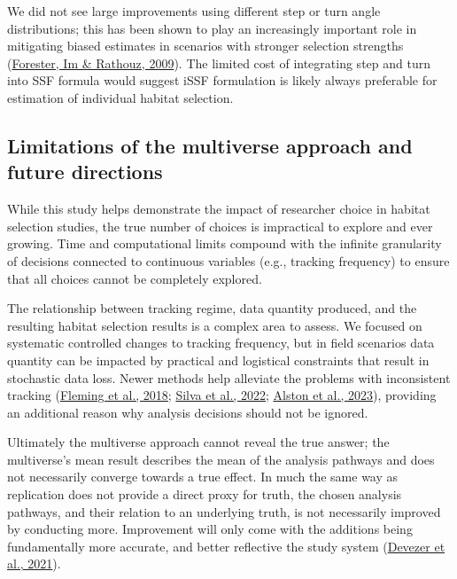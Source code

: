 \documentclass[10pt,a4paper]{article}
\begin{document}
We did not see large improvements using different step or turn angle distributions; this has been shown to play an increasingly important role in mitigating biased estimates in scenarios with stronger selection strengths (\protect\hyperlink{ref-forester_accounting_2009}{Forester, Im \& Rathouz, 2009}).
The limited cost of integrating step and turn into SSF formula would suggest iSSF formulation is likely always preferable for estimation of individual habitat selection.

\hypertarget{limitations-of-the-multiverse-approach-and-future-directions}{%
\subsection{Limitations of the multiverse approach and future directions}\label{limitations-of-the-multiverse-approach-and-future-directions}}

While this study helps demonstrate the impact of researcher choice in habitat selection studies, the true number of choices is impractical to explore and ever growing.
Time and computational limits compound with the infinite granularity of decisions connected to continuous variables (e.g., tracking frequency) to ensure that all choices cannot be completely explored.

The relationship between tracking regime, data quantity produced, and the resulting habitat selection results is a complex area to assess.
We focused on systematic controlled changes to tracking frequency, but in field scenarios data quantity can be impacted by practical and logistical constraints that result in stochastic data loss.
Newer methods help alleviate the problems with inconsistent tracking (\protect\hyperlink{ref-fleming_correcting_2018}{Fleming et al., 2018}; \protect\hyperlink{ref-silva_autocorrelationinformed_2022}{Silva et al., 2022}; \protect\hyperlink{ref-alston_mitigating_2023}{Alston et al., 2023}), providing an additional reason why analysis decisions should not be ignored.

Ultimately the multiverse approach cannot reveal the true answer; the multiverse's mean result describes the mean of the analysis pathways and does not necessarily converge towards a true effect.
In much the same way as replication does not provide a direct proxy for truth, the chosen analysis pathways, and their relation to an underlying truth, is not necessarily improved by conducting more.
Improvement will only come with the additions being fundamentally more accurate, and better reflective the study system (\protect\hyperlink{ref-devezer_case_2021}{Devezer et al., 2021}).
\end{document}
